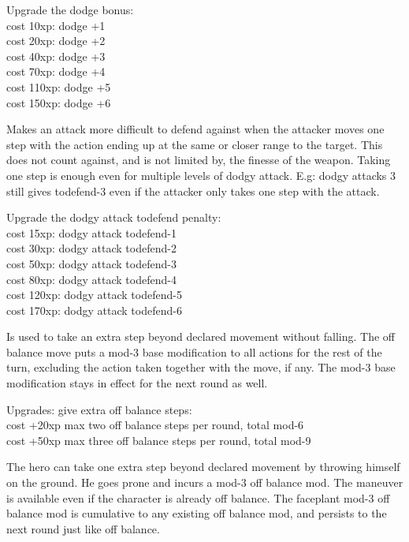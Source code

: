 Upgrade the dodge bonus:\\
cost  10xp: dodge +1 \\
cost  20xp: dodge +2 \\
cost  40xp: dodge +3 \\
cost  70xp: dodge +4 \\
cost 110xp: dodge +5 \\
cost 150xp: dodge +6


Makes an attack more difficult to defend against when the attacker moves one step with the action ending up at the same or closer range to the target. This does not count against, and is not limited by, the finesse of the weapon. Taking one step is enough even for multiple levels of dodgy attack. E.g: dodgy attacks 3 still gives todefend-3 even if the attacker only takes one step with the attack.

Upgrade the dodgy attack todefend penalty:\\
cost  15xp: dodgy attack todefend-1 \\
cost  30xp: dodgy attack todefend-2 \\
cost  50xp: dodgy attack todefend-3 \\
cost  80xp: dodgy attack todefend-4 \\
cost 120xp: dodgy attack todefend-5 \\
cost 170xp: dodgy attack todefend-6


Is used to take an extra step beyond declared movement without falling. The off balance move puts a mod-3 base modification to all actions for the rest of the turn, excluding the action taken together with the move, if any. The mod-3 base modification stays in effect for the next round as well.

\noindent Upgrades: give extra off balance steps: \\
cost +20xp max two off balance steps per round, total mod-6 \\
cost +50xp max three off balance steps per round, total mod-9


The hero can take one extra step beyond declared movement by throwing himself on the ground. He goes prone and incurs a mod-3 off balance mod. The maneuver is available even if the character is already off balance. The faceplant mod-3 off balance mod is cumulative to any existing off balance mod, and persists to the next round just like off balance.


